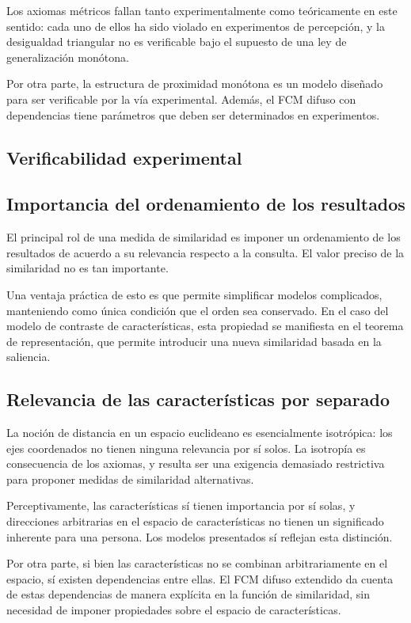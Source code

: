 \documentclass[spanish]{article}
\begin{document}
Los axiomas métricos fallan tanto experimentalmente como teóricamente en este
sentido:  cada uno de ellos ha sido violado en experimentos de percepción, y la
desigualdad triangular no es verificable bajo el supuesto de una ley de
generalización monótona.

Por otra parte, la estructura de proximidad monótona es un modelo diseñado para
ser verificable por la vía experimental.  Además, el FCM difuso con dependencias
tiene parámetros que deben ser determinados en experimentos.

\subsection{Verificabilidad experimental}


\subsection{Importancia del ordenamiento de los resultados}
El principal rol de una medida de similaridad es imponer un ordenamiento de los
resultados de acuerdo a su relevancia respecto a la consulta.  El valor preciso
de la similaridad no es tan importante.

Una ventaja práctica de esto es que permite simplificar modelos complicados,
manteniendo como única condición que el orden sea conservado.  En el caso del
modelo de contraste de características, esta propiedad se manifiesta en el
teorema de representación, que permite introducir una nueva similaridad basada
en la saliencia.

\subsection{Relevancia de las características por separado}
La noción de distancia en un espacio euclideano es esencialmente isotrópica: los
ejes coordenados no tienen ninguna relevancia por sí solos.  La isotropía es
consecuencia de los axiomas, y resulta ser una exigencia demasiado restrictiva
para proponer medidas de similaridad alternativas.

Perceptivamente, las características sí tienen importancia por sí
solas, y direcciones arbitrarias en el espacio de características no tienen
un significado inherente para una persona.  Los modelos presentados sí reflejan
esta distinción.

Por otra parte, si bien las características no se combinan arbitrariamente en el
espacio, sí existen dependencias entre ellas.  El FCM difuso extendido da cuenta
de estas dependencias de manera explícita en la función de similaridad, sin
necesidad de imponer propiedades sobre el espacio de características.
\end{document}
